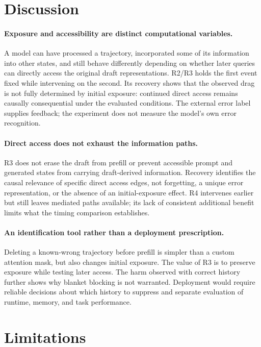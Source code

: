 \documentclass{article}
\begin{document}
\section{Discussion}
\label{sec:discussion}

\paragraph{Exposure and accessibility are distinct computational variables.}
A model can have processed a trajectory, incorporated some of its information into other states, and still behave differently depending on whether later queries can directly access the original draft representations. R2/R3 holds the first event fixed while intervening on the second. Its recovery shows that the observed drag is not fully determined by initial exposure: continued direct access remains causally consequential under the evaluated conditions. The external error label supplies feedback; the experiment does not measure the model's own error recognition.

\paragraph{Direct access does not exhaust the information paths.}
R3 does not erase the draft from prefill or prevent accessible prompt and generated states from carrying draft-derived information. Recovery identifies the causal relevance of specific direct access edges, not forgetting, a unique error representation, or the absence of an initial-exposure effect. R4 intervenes earlier but still leaves mediated paths available; its lack of consistent additional benefit limits what the timing comparison establishes.

\paragraph{An identification tool rather than a deployment prescription.}
Deleting a known-wrong trajectory before prefill is simpler than a custom attention mask, but also changes initial exposure. The value of R3 is to preserve exposure while testing later access. The harm observed with correct history further shows why blanket blocking is not warranted. Deployment would require reliable decisions about which history to suppress and separate evaluation of runtime, memory, and task performance.

\section{Limitations}
\end{document}
